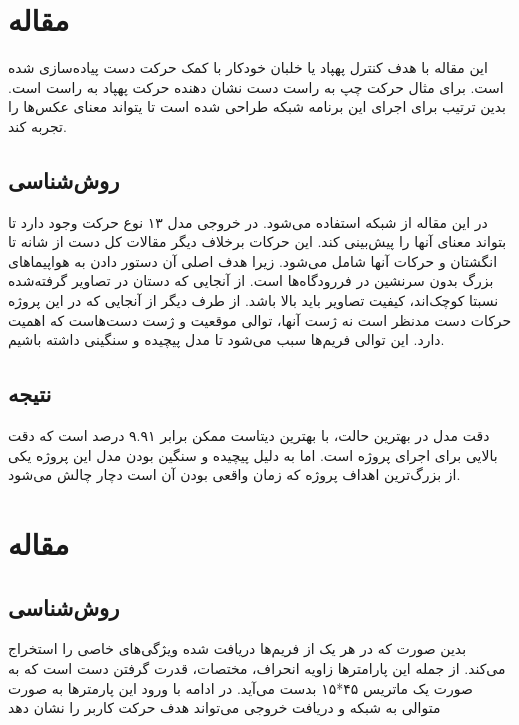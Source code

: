 \section{مقاله }
این مقاله با هدف کنترل پهپاد یا خلبان خودکار با کمک حرکت دست پیاده‌سازی شده است. برای مثال حرکت چپ به راست دست نشان دهنده حرکت پهپاد به راست است. بدین ترتیب برای اجرای این برنامه شبکه  طراحی شده است تا یتواند معنای عکس‌ها را تجربه کند.

\subsection{روش‌شناسی}
در این مقاله از شبکه‌‌  استفاده می‌شود. در خروجی مدل ۱۳ نوع حرکت وجود دارد تا بتواند معنای آنها را پیش‌بینی کند. این حرکات برخلاف دیگر مقالات کل دست از شانه تا انگشتان و حرکات آنها شامل می‌شود. زیرا هدف اصلی آن دستور دادن به هواپیما‌های بزرگ بدون سرنشین در فررودگاه‌ها است. از آنجایی که دستان در تصاویر گرفته‌شده نسبتا کوچک‌اند، کیفیت تصاویر باید بالا باشد. از طرف دیگر از آنجایی که در این پروژه حرکات دست مدنظر است نه ژست آنها، توالی موقعیت و ژست دست‌هاست که اهمیت دارد. این توالی فریم‌ها سبب می‌شود تا مدل پیچیده و سنگینی داشته باشیم.

\subsection{نتیجه}
دقت مدل در بهترین حالت، با بهترین دیتاست ممکن برابر ۹.۹۱ درصد است که دقت بالایی برای اجرای پروژه است. اما به دلیل پیچیده و سنگین بودن مدل این پروژه یکی از بزرگ‌ترین اهداف پروژه که زمان واقعی بودن آن است دچار چالش می‌شود.\cite{perera2018uav}

\section{مقاله }

\subsection{روش‌شناسی}
بدین صورت که در هر یک از فریم‌ها دریافت شده ویژگی‌های خاصی را استخراج می‌کند. از جمله این پارامترها زاویه انحراف، مختصات، قدرت گرفتن دست است که به صورت یک ماتریس ۴۵*۱۵ بدست می‌آید. در ادامه با ورود این پارمتر‌ها به صورت متوالی به شبکه و دریافت خروجی می‌تواند هدف حرکت کاربر را نشان دهد
